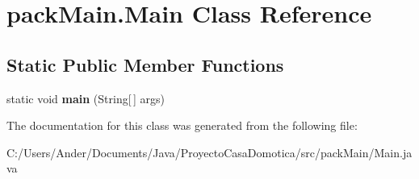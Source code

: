 \hypertarget{classpack_main_1_1_main}{}\section{pack\+Main.\+Main Class Reference}
\label{classpack_main_1_1_main}
\subsection*{Static Public Member Functions}
\begin{DoxyCompactItemize}
\item 
\mbox{\label{classpack_main_1_1_main_a9f56025f10849a4cd4b6566e781e361a}} 
static void {\bfseries main} (String\mbox{[}$\,$\mbox{]} args)
\end{DoxyCompactItemize}


The documentation for this class was generated from the following file\+:\begin{DoxyCompactItemize}
\item 
C\+:/\+Users/\+Ander/\+Documents/\+Java/\+Proyecto\+Casa\+Domotica/src/pack\+Main/Main.\+java\end{DoxyCompactItemize}
